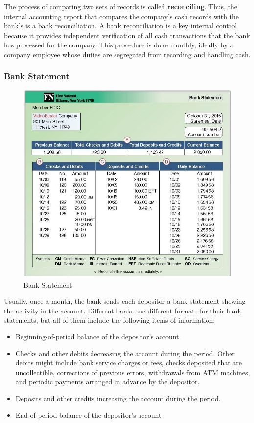\documentclass[../main.tex]{subfiles}
\begin{document}
	The process of comparing two sets of records is called 
	\textbf{reconciling}. Thus, the internal accounting report that compares 
	the company’s cash records with the bank’s is a bank reconciliation. A bank 
	reconciliation is a key internal control because it provides independent 
	verification of all cash transactions that the bank has processed for the 
	company. This procedure is done monthly, ideally by a company employee 
	whose duties are segregated from recording and handling cash. 
	
	\subsubsection{Bank Statement}
	
	\begin{figure}[ht]
		\centering
		\includegraphics[width=1\columnwidth]{images/c5/bank_statement.png}
		\caption{Bank Statement}
	\end{figure}
	
	Usually, once a month, the bank sends each depositor a bank statement 
	showing the activity in the account. Different banks use different formats 
	for their bank statements, but all of 
	them include the following items of information:
	\begin{itemize}[noitemsep]
		\item Beginning-of-period balance of the depositor’s account.
		\item Checks and other debits decreasing the account during the period. 
		Other debits might include bank service charges or fees, checks 
		deposited that are uncollectible, corrections of previous errors, 
		withdrawals from ATM machines, and periodic payments arranged in 
		advance by the depositor. 
		\item Deposits and other credits increasing the account during the 
		period.
		\item End-of-period balance of the depositor’s account.
	\end{itemize}
	
\end{document}
